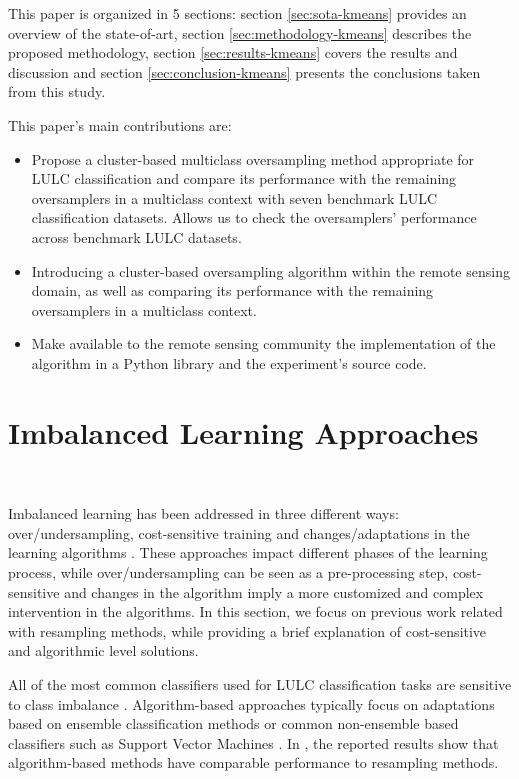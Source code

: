 This paper is organized in 5 sections: section \ref{sec:sota-kmeans} provides an
overview of the state-of-art, section \ref{sec:methodology-kmeans} describes the
proposed methodology, section \ref{sec:results-kmeans} covers the results and
discussion and section \ref{sec:conclusion-kmeans} presents the conclusions taken from
this study.

This paper's main contributions are:
\begin{itemize}
    \item Propose a cluster-based multiclass oversampling method appropriate
        for LULC classification and compare its performance with the remaining
        oversamplers in a multiclass context with seven benchmark LULC
        classification datasets. Allows us to check the oversamplers'
        performance across benchmark LULC datasets.
    \item Introducing a cluster-based oversampling algorithm within the remote
        sensing domain, as well as comparing its performance with the remaining
        oversamplers in a multiclass context.
    \item Make available to the remote sensing community the implementation
        of the algorithm in a Python library and the experiment's source
        code.
\end{itemize}

\section{Imbalanced Learning Approaches}~\label{sec:sota-kmeans}

Imbalanced learning has been addressed in three different ways:
over/undersampling, cost-sensitive training and changes/adaptations in the
learning algorithms \cite{Kaur2019}. These approaches impact different
phases of the learning process, while over/undersampling can be seen as a
pre-processing step, cost-sensitive and changes in the algorithm imply a more
customized and complex intervention in the algorithms. In this
section, we focus on previous work related with resampling methods, while
providing a brief explanation of cost-sensitive and algorithmic level solutions.

All of the most common classifiers used for LULC classification tasks
\cite{Khatami2016, Gavade2019} are sensitive to class imbalance
\cite{Blagus2010}. Algorithm-based approaches typically focus on adaptations
based on ensemble classification methods \cite{Mellor2015} or common
non-ensemble based classifiers such as Support Vector Machines \cite{Shao2014}.
In \cite{Lee2016}, the reported results show that algorithm-based methods have
comparable performance to resampling methods.

